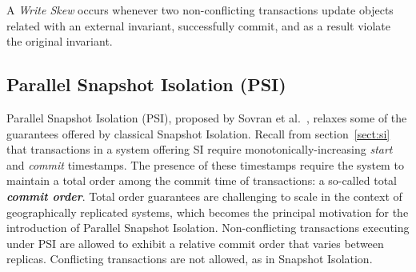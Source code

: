 

\begin{definition}
A \emph{Write Skew} occurs whenever two non-conflicting transactions update objects related with an external invariant, successfully commit, and as a result violate the original invariant.
\end{definition}


\subsection{Parallel Snapshot Isolation (PSI)}


Parallel Snapshot Isolation (PSI), proposed by Sovran et al.~\citep{psi-intro}, relaxes some of the guarantees offered by classical Snapshot Isolation. Recall from section~\ref{sect:si} that transactions in a system offering SI require monotonically-increasing \emph{start} and \emph{commit} timestamps. The presence of these timestamps require the system to maintain a total order among the commit time of transactions: a so-called total \textbf{\em commit order}. Total order guarantees are challenging to scale in the context of geographically replicated systems, which becomes the principal motivation for the introduction of Parallel Snapshot Isolation. Non-conflicting transactions executing under PSI are allowed to exhibit a relative commit order that varies between replicas. Conflicting transactions are not allowed, as in Snapshot Isolation.

